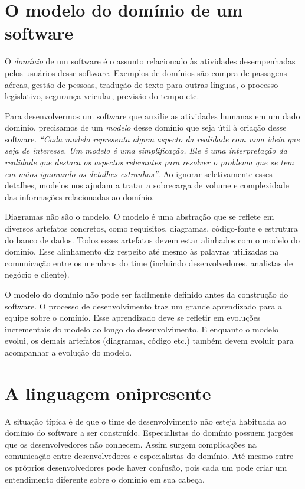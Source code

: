 \documentclass[a4paper, 12pt]{article}
\newcommand{\citacao}[1]{\emph{``#1''}}
\begin{document}
\section{O modelo do domínio de um software}

O \emph{domínio} de um software é o assunto relacionado às atividades desempenhadas pelos usuários desse software. Exemplos de domínios são compra de passagens aéreas, gestão de pessoas, tradução de texto para outras línguas, o processo legislativo, segurança veicular, previsão do tempo etc.

Para desenvolvermos um software que auxilie as atividades humanas em um dado domínio, precisamos de um \emph{modelo} desse domínio que seja útil à criação desse software. \citacao{Cada modelo representa algum aspecto da realidade com uma ideia que seja de interesse. Um modelo é uma simplificação. Ele é uma interpretação da realidade que destaca os aspectos relevantes para resolver o problema que se tem em mãos ignorando os detalhes estranhos}. Ao ignorar seletivamente esses detalhes, modelos nos ajudam a tratar a sobrecarga de volume e complexidade das informações relacionadas ao domínio. 

Diagramas não são o modelo. O modelo é uma abstração que se reflete em diversos artefatos concretos, como requisitos, diagramas, código-fonte e estrutura do banco de dados. Todos esses artefatos devem estar alinhados com o modelo do domínio. Esse alinhamento diz respeito até mesmo às palavras utilizadas na comunicação entre os membros do time (incluindo desenvolvedores, analistas de negócio e cliente).

O modelo do domínio não pode ser facilmente definido antes da construção do software. O processo de desenvolvimento traz um grande aprendizado para a equipe sobre o domínio. Esse aprendizado deve se refletir em evoluções incrementais do modelo ao longo do desenvolvimento. E enquanto o modelo evolui, os demais artefatos (diagramas, código etc.) também devem evoluir para acompanhar a evolução do modelo. 

\section{A linguagem onipresente}

A situação típica é de que o time de desenvolvimento não esteja habituada ao domínio do software a ser construído. Especialistas do domínio possuem jargões que os desenvolvedores não conhecem. Assim surgem complicações na comunicação entre desenvolvedores e especialistas do domínio. Até mesmo entre os próprios desenvolvedores pode haver confusão, pois cada um pode criar um entendimento diferente sobre o domínio em sua cabeça.
\end{document}
